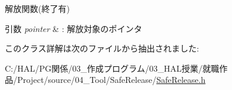 解放関数(終了有) 


\begin{DoxyParams}{引数}
{\em pointer} & \+: 解放対象のポインタ \\
\hline
\end{DoxyParams}


このクラス詳解は次のファイルから抽出されました\+:\begin{DoxyCompactItemize}
\item 
C\+:/\+H\+A\+L/\+P\+G関係/03\+\_\+作成プログラム/03\+\_\+\+H\+A\+L授業/就職作品/\+Project/source/04\+\_\+\+Tool/\+Safe\+Release/\mbox{\hyperlink{_safe_release_8h}{Safe\+Release.\+h}}\end{DoxyCompactItemize}

